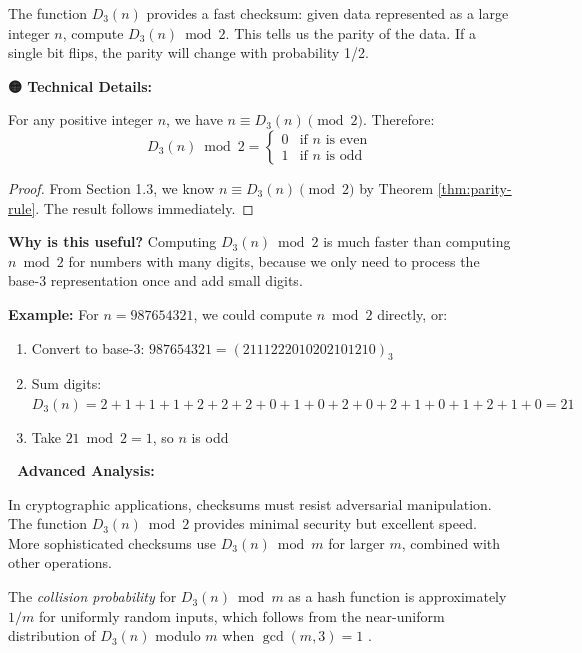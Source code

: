 The function $D_3(n)$ provides a fast checksum: given data represented as a large integer $n$, compute $D_3(n) \bmod 2$. This tells us the parity of the data. If a single bit flips, the parity will change with probability 1/2.

\textbf{🟡 Technical Details:}

\begin{proposition}
\label{prop:parity-checksum}
For any positive integer $n$, we have $n \equiv D_3(n) \pmod{2}$. Therefore:
\begin{equation}
D_3(n) \bmod 2 = \begin{cases}
0 & \text{if } n \text{ is even} \\
1 & \text{if } n \text{ is odd}
\end{cases}
\end{equation}
\end{proposition}

\begin{proof}
From Section 1.3, we know $n \equiv D_3(n) \pmod{2}$ by Theorem \ref{thm:parity-rule}. The result follows immediately.
\end{proof}

\textbf{Why is this useful?} Computing $D_3(n) \bmod 2$ is much faster than computing $n \bmod 2$ for numbers with many digits, because we only need to process the base-3 representation once and add small digits.

\textbf{Example:} For $n = 987654321$, we could compute $n \bmod 2$ directly, or:
\begin{enumerate}
\item Convert to base-3: $987654321 = (2111222010202101210)_3$
\item Sum digits: $D_3(n) = 2+1+1+1+2+2+2+0+1+0+2+0+2+1+0+1+2+1+0 = 21$
\item Take $21 \bmod 2 = 1$, so $n$ is odd
\end{enumerate}

\textbf{🔴 Advanced Analysis:}

In cryptographic applications, checksums must resist adversarial manipulation. The function $D_3(n) \bmod 2$ provides minimal security but excellent speed. More sophisticated checksums use $D_3(n) \bmod m$ for larger $m$, combined with other operations.

The \textit{collision probability} for $D_3(n) \bmod m$ as a hash function is approximately $1/m$ for uniformly random inputs, which follows from the near-uniform distribution of $D_3(n)$ modulo $m$ when $\gcd(m, 3) = 1$ \cite{knuth1997}.

